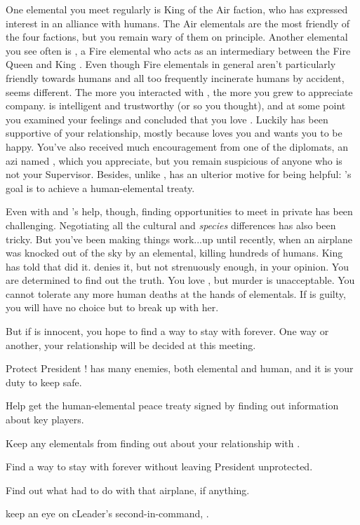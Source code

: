 \documentclass[char]{elementals}
\begin{document}
One elemental you meet regularly is King \cKing{\intro} of the Air faction, who has expressed interest in an alliance with humans.  The Air elementals are the most friendly of the four factions, but you remain wary of them on principle.  Another elemental you see often is \cJuliet{\intro}, a Fire elemental who acts as an intermediary between the Fire Queen \cQueen{\intro} and King \cKing{}.  Even though Fire elementals in general aren't particularly friendly towards humans and all too frequently incinerate humans by accident, \cJuliet{} seems different.  The more you interacted with \cJuliet{\them}, the more you grew to appreciate \cJuliet{\their} company.  \cJuliet{\They} is intelligent and trustworthy (or so you thought), and at some point you examined your feelings and concluded that you love \cJuliet{\them}.  Luckily \cLeader{} has been supportive of your relationship, mostly because \cLeader{\they} loves you and wants you to be happy.  You've also received much encouragement from one of the diplomats, an azi named \cDiplomat{\intro}, which you appreciate, but you remain suspicious of anyone who is not your Supervisor.  Besides, unlike \cLeader{}, \cDiplomat{\they} has an ulterior motive for being helpful: \cDiplomat{}'s goal is to achieve a human-elemental treaty.

Even with \cLeader{} and \cDiplomat{}'s help, though, finding opportunities to meet \cJuliet{} in private has been challenging.  Negotiating all the cultural and \emph{species} differences has also been tricky.   But you've been making things work...up until recently, when an airplane was knocked out of the sky by an elemental, killing hundreds of humans.  King \cKing{} has told \cLeader{} that \cJuliet{} did it.  \cJuliet{\They} denies it, but not strenuously enough, in your opinion.  You are determined to find out the truth.  You love \cJuliet{\them}, but murder is unacceptable.  You cannot tolerate any more human deaths at the hands of elementals.  If \cJuliet{\they} is guilty, you will have no choice but to break up with her.  

But if \cJuliet{\they} is innocent, you hope to find a way to stay with \cJuliet{\them} forever.  One way or another, your relationship will be decided at this meeting.




\begin{itemz}[Goals]
  \item Protect President \cLeader{}!  \cLeader{\They} has many enemies, both elemental and human, and it is your duty to keep \cLeader{\them} safe.
  \item Help \cLeader{} get the human-elemental peace treaty signed by finding out information about key players.
  \item Keep any elementals from finding out about your relationship with \cJuliet{}.
  \item Find a way to stay with \cJuliet{} forever without leaving President \cLeader{} unprotected.
  \item Find out what \cJuliet{} had to do with that airplane, if anything.
  \item keep an eye on cLeader{}'s second-in-command, \cDema{}.
\end{itemz}
\end{document}
